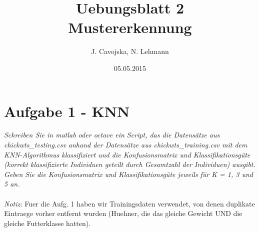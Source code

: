\documentclass[12pt]{article}
\title{Uebungsblatt 2\\ \glqq Mustererkennung\grqq}
\author{J. Cavojska, N. Lehmann}
\date{05.05.2015}
\begin{document}
\maketitle

\section{Aufgabe 1 - KNN}
\textit{Schreiben Sie in matlab oder octave ein Script, das die Datensätze aus ​chickwts\_testing.csv​ anhand der Datensätze aus chickwts\_training.csv​ mit dem K­NN-­Algorithmus klassifiziert und die Konfusionsmatrix und Klassifikationsgüte (korrekt klassifizierte Individuen geteilt durch Gesamtzahl der Individuen) ausgibt. Geben Sie die Konfusionsmatrix und Klassifikationsgüte jeweils für K = 1, 3 und 5 an.}\\
\\
\textit{Notiz:} Fuer die Aufg. 1 haben wir Trainingsdaten verwendet, von denen duplikate Eintraege vorher entfernt wurden (Huehner, die das gleiche Gewicht UND die gleiche Futterklasse hatten).\\
\end{document}
